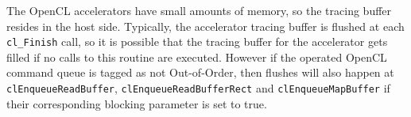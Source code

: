 The OpenCL accelerators have small amounts of memory, so the tracing buffer resides in the host side.
Typically, the accelerator tracing buffer is flushed at each {\tt cl\_Finish} call, so it is possible that the tracing buffer for the accelerator gets filled if no calls to this routine are executed.
However if the operated OpenCL command queue is tagged as not Out-of-Order, then flushes will also happen at {\tt clEnqueueReadBuffer}, {\tt clEnqueueReadBufferRect} and {\tt clEnqueueMapBuffer} if their corresponding blocking parameter is set to true.


